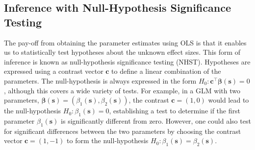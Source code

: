 \subsection{Inference with Null-Hypothesis Significance Testing}
\label{sec:NHST}
The pay-off from obtaining the parameter estimates using OLS is that it enables us to statistically test hypotheses about the unknown effect sizes. This form of inference is known as null-hypothesis significance testing (NHST). Hypotheses are expressed using a contrast vector $\bm{c}$ to define a linear combination of the parameters. The null-hypothesis is always expressed in the form $H_{0} : \bm{c}^{\intercal}\bm{\beta}(\bm{s}) = 0$, although this covers a wide variety of tests. For example, in a GLM with two parameters, $\bm{\beta}(\bm{s}) = (\beta_{1}(\bm{s}), \beta_{2}(\bm{s}))$, the contrast $\bm{c} = (1, 0)$ would lead to the null-hypothesis $H_{0} : \beta_{1}(\bm{s}) = 0$, establishing a test to determine if the first parameter $\beta_{1}(\bm{s})$ is significantly different from zero. However, one could also test for significant differences between the two parameters by choosing the contrast vector $\bm{c} = (1, -1)$ to form the null-hypothesis $H_{0} : \beta_{1}(\bm{s}) = \beta_{2}(\bm{s})$. 

